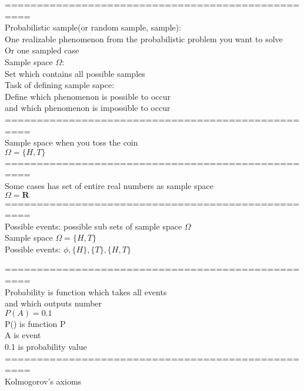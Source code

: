 \documentclass{article}
\begin{document}
================================================== \\
Probabilistic sample(or random sample, sample): \\ 
One realizable phenomenon from the probabilistic problem you want to solve \\ 
Or one sampled case \\ 

Sample space $\Omega$: \\ 
Set which contains all possible samples \\ 

Task of defining sample sapce: \\
Define which phenomenon is possible to occur \\
and which phenomenon is impossible to occur \\ 

================================================== \\
Sample space when you toss the coin \\ 
$\Omega =\{H,T\}$ \\ 

================================================== \\
Some cases has set of entire real numbers as sample space \\ 
$\Omega = \mathbf{R}$ \\ 

================================================== \\
Possible events: possible sub sets of sample space $\Omega$ \\ 

Sample space $\Omega=\{H,T\}$ \\ 
Possible events: $\phi,\{H\},\{T\},\{H,T\}$

================================================== \\
Probability is function which takes all events \\
and which outputs number \\ 

$P(A)=0.1$ \\
P() is function P \\
A is event \\
0.1 is probability value \\

================================================== \\
Kolmogorov's axioms \\ 
\end{document}
